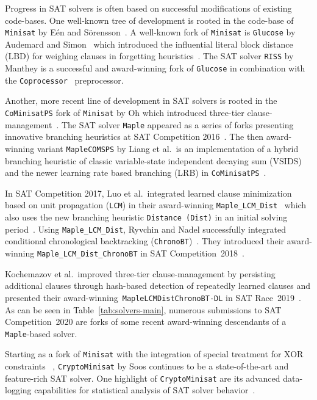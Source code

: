 \documentclass{elsarticle}
\newcommand{\solver}[1]{\texttt{#1}}
\begin{document}
Progress in SAT solvers is often based on successful modifications of existing code-bases. 
One well-known tree of development is rooted in the code-base of \solver{Minisat} by E\'en and S\"orensson~\cite{Niklas:2003:Minisat}. 
A well-known fork of \solver{Minisat} is \solver{Glucose} by Audemard and Simon~\cite{Audemard:2018:Glucose} which introduced the influential literal block distance (LBD) for weighing clauses in forgetting heuristics~\cite{Audemard:2009:Glucose}. 
The SAT solver \solver{RISS} by Manthey is a successful and award-winning fork of \solver{Glucose} in combination with the \solver{Coprocessor}~\cite{Manthey:2012:Coprocessor2} preprocessor. 

Another, more recent line of development in SAT solvers
is rooted in the \solver{CoMinisatPS} fork of \solver{Minisat} by Oh which introduced three-tier clause-management~\cite{Oh:2015:satunsat}. 
The SAT solver \solver{Maple} appeared as a series of forks presenting innovative branching heuristics at SAT Competition 2016~\cite{Liang:2016:LRB}. 
The then award-winning variant \solver{MapleCOMSPS} by Liang et al.~is an implementation of a hybrid branching heuristic of classic variable-state independent decaying sum (VSIDS)~\cite{Zhang:2001:ClauseLearning} and the newer learning rate based branching (LRB) in \solver{CoMinisatPS}~\cite{Liang:2016:MapleCOMSPS}. 

In SAT Competition 2017, Luo et al.~integrated learned clause minimization based on unit propagation (\solver{LCM}) in their award-winning \solver{Maple\_LCM\_Dist}~\cite{Luo:2017:LCM} which also uses the new branching heuristic \solver{Distance (Dist)} in an initial solving period~\cite{Xiao:2017:MapleLCMDist}. 
Using \solver{Maple\_LCM\_Dist}, Ryvchin and Nadel successfully integrated conditional chronological backtracking (\solver{ChronoBT})~\cite{Nadel:2018:CBT}. 
They introduced their award-winning \solver{Maple\_LCM\_Dist\_ChronoBT} in SAT Competition~2018~\cite{Ryvchin:SC2018:MapleChronoBT}. 

Kochemazov et al.~improved three-tier clause-management by persisting
additional clauses through hash-based detection of repeatedly learned clauses and presented their award-winning~\solver{MapleLCMDistChronoBT-DL} in SAT Race~2019~\cite{Kochemazov:SC2019:MapleChronoBTDL}. 
As can be seen in Table~\ref{tab:solvers-main}, numerous submissions to SAT Competition~2020 are forks of some recent award-winning descendants of a \solver{Maple}-based solver. 

Starting as a fork of \solver{Minisat} with the integration of special treatment for XOR constraints ~\cite{Soos:2009:Crypto},
\solver{CryptoMinisat} by Soos continues to be a state-of-the-art and feature-rich SAT solver. 
One highlight of \solver{CryptoMinisat} are its advanced data-logging capabilities for statistical analysis of SAT solver behavior~\cite{Soos:2019:ChrystalBall}.
\end{document}
